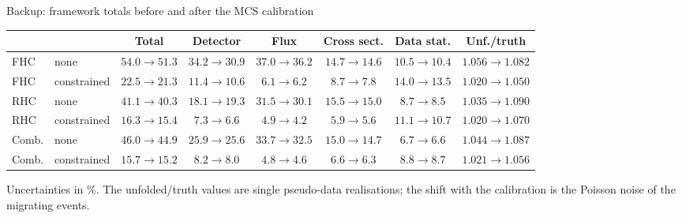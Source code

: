 \documentclass[aspectratio=169,10pt]{beamer}
\begin{document}
\begin{frame}{Backup: framework totals before and after the MCS calibration}
  \footnotesize
  \begin{center}\setlength{\tabcolsep}{3.5pt}
  \begin{tabular}{llcccccc}
    \toprule
    & & Total & Detector & Flux & Cross sect. & Data stat. & Unf./truth \\
    \midrule
    FHC & none        & $54.0\to51.3$ & $34.2\to30.9$ & $37.0\to36.2$ & $14.7\to14.6$ & $10.5\to10.4$ & $1.056\to1.082$ \\
    FHC & constrained & $22.5\to21.3$ & $11.4\to10.6$ & $6.1\to6.2$   & $8.7\to7.8$   & $14.0\to13.5$ & $1.020\to1.050$ \\
    RHC & none        & $41.1\to40.3$ & $18.1\to19.3$ & $31.5\to30.1$ & $15.5\to15.0$ & $8.7\to8.5$   & $1.035\to1.090$ \\
    RHC & constrained & $16.3\to15.4$ & $7.3\to6.6$   & $4.9\to4.2$   & $5.9\to5.6$   & $11.1\to10.7$ & $1.020\to1.070$ \\
    Comb. & none      & $46.0\to44.9$ & $25.9\to25.6$ & $33.7\to32.5$ & $15.0\to14.7$ & $6.7\to6.6$   & $1.044\to1.087$ \\
    Comb. & constrained & $15.7\to15.2$ & $8.2\to8.0$ & $4.8\to4.6$   & $6.6\to6.3$   & $8.8\to8.7$   & $1.021\to1.056$ \\
    \bottomrule
  \end{tabular}
  \end{center}
  {\footnotesize Uncertainties in \%. The unfolded/truth values are single pseudo-data realisations; the shift
  with the calibration is the Poisson noise of the migrating events.}
\end{frame}
\end{document}
